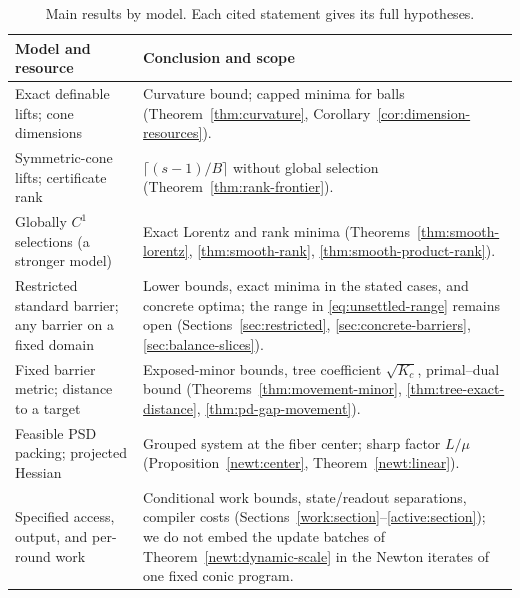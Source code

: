 \begin{table}[p]
\centering\small
\caption{Main results by model. Each cited statement gives its full
hypotheses.}
\label{tab:models}
\renewcommand{\arraystretch}{1.18}
\begin{tabular}{@{}>{\raggedright\arraybackslash}p{}>{\raggedright\arraybackslash}p{}@{}}
\toprule
Model and resource & Conclusion and scope\\
\midrule
Exact definable lifts; cone dimensions
& Curvature bound; capped minima for balls
(Theorem~\ref{thm:curvature}, Corollary~\ref{cor:dimension-resources}).\\
Symmetric-cone lifts; certificate rank
& $\lceil(s-1)/B\rceil$ without global selection
(Theorem~\ref{thm:rank-frontier}).\\
Globally $C^1$ selections (a stronger model)
& Exact Lorentz and rank minima
(Theorems~\ref{thm:smooth-lorentz}, \ref{thm:smooth-rank},
\ref{thm:smooth-product-rank}).\\
Restricted standard barrier; any barrier on a fixed domain
& Lower bounds, exact minima in the stated cases, and concrete optima;
the range in \eqref{eq:unsettled-range} remains open
(Sections~\ref{sec:restricted}, \ref{sec:concrete-barriers},
\ref{sec:balance-slices}).\\
Fixed barrier metric; distance to a target
& Exposed-minor bounds, tree coefficient $\sqrt{K_c}$, primal--dual bound
(Theorems~\ref{thm:movement-minor}, \ref{thm:tree-exact-distance},
\ref{thm:pd-gap-movement}).\\
Feasible PSD packing; projected Hessian
& Grouped system at the fiber center; sharp factor $L/\mu$
(Proposition~\ref{newt:center}, Theorem~\ref{newt:linear}).\\
Specified access, output, and per-round work
& Conditional work bounds, state/readout separations, compiler costs
(Sections~\ref{work:section}--\ref{active:section}); we do not embed
the update batches of Theorem~\ref{newt:dynamic-scale} in the Newton
iterates of one fixed conic program.\\
\bottomrule
\end{tabular}
\end{table}

